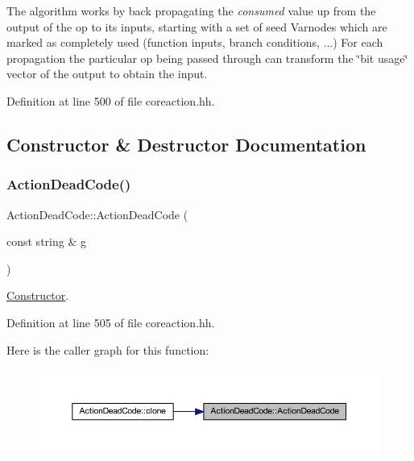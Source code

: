 The algorithm works by back propagating the {\itshape consumed} value up from the output of the op to its inputs, starting with a set of seed Varnodes which are marked as completely used (function inputs, branch conditions, ...) For each propagation the particular op being passed through can transform the \char`\"{}bit usage\char`\"{} vector of the output to obtain the input. 

Definition at line 500 of file coreaction.\+hh.



\subsection{Constructor \& Destructor Documentation}
\mbox{\label{class_action_dead_code_a82b4ed28ec16668d34478c4859cd3845}} 
\subsubsection{\texorpdfstring{ActionDeadCode()}{ActionDeadCode()}}
{\footnotesize\ttfamily Action\+Dead\+Code\+::\+Action\+Dead\+Code (\begin{DoxyParamCaption}\item[{const string \&}]{g }\end{DoxyParamCaption})\hspace{0.3cm}{\ttfamily [inline]}}



\mbox{\hyperlink{class_constructor}{Constructor}}. 



Definition at line 505 of file coreaction.\+hh.

Here is the caller graph for this function\+:
\nopagebreak
\begin{figure}[H]
\begin{center}
\leavevmode
\includegraphics[width=350pt]{class_action_dead_code_a82b4ed28ec16668d34478c4859cd3845_icgraph}
\end{center}
\end{figure}


